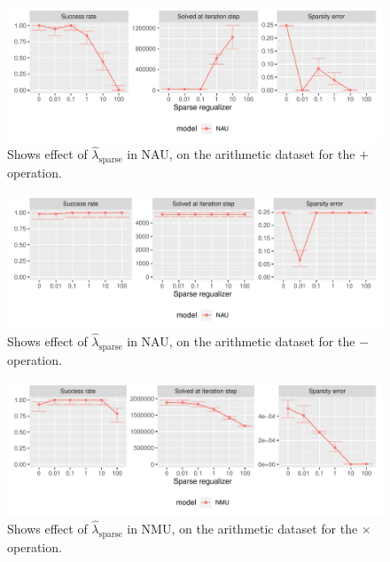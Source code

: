 \begin{figure}[H]
\centering
\includegraphics[width=\linewidth,trim={0 1.3cm 0 0},clip]{results/simple_function_static_regualization_add.pdf}
\caption{Shows effect of $\hat{\lambda}_{\mathrm{sparse}}$ in NAU, on the arithmetic dataset for the $\bm{+}$ operation.}
\label{fig:simple-fnction-static-regularizer-add}
\end{figure}

\begin{figure}[H]
\centering
\includegraphics[width=\linewidth,trim={0 1.3cm 0 0},clip]{results/simple_function_static_regualization_sub.pdf}
\caption{Shows effect of $\hat{\lambda}_{\mathrm{sparse}}$ in NAU, on the arithmetic dataset for the $\bm{-}$ operation.}
\label{fig:simple-fnction-static-regularizer-sub}
\end{figure}

\begin{figure}[H]
\centering
\includegraphics[width=\linewidth,trim={0 1.3cm 0 0},clip]{results/simple_function_static_regualization_mul.pdf}
\caption{Shows effect of $\hat{\lambda}_{\mathrm{sparse}}$ in NMU, on the arithmetic dataset for the $\bm{\times}$ operation.}
\label{fig:simple-fnction-static-regularizer-mul}
\end{figure}

